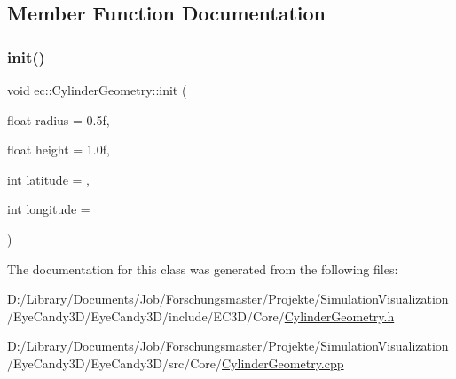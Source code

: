 \subsection{Member Function Documentation}
\mbox{\label{classec_1_1_cylinder_geometry_a099fbcb7e2fbbaec506ccc115ad90ffc}} 
\subsubsection{\texorpdfstring{init()}{init()}}
{\footnotesize\ttfamily void ec\+::\+Cylinder\+Geometry\+::init (\begin{DoxyParamCaption}\item[{float}]{radius = {\ttfamily 0.5f},  }\item[{float}]{height = {\ttfamily 1.0f},  }\item[{int}]{latitude = {},  }\item[{int}]{longitude = {} }\end{DoxyParamCaption})}



The documentation for this class was generated from the following files\+:\begin{DoxyCompactItemize}
\item 
D\+:/\+Library/\+Documents/\+Job/\+Forschungsmaster/\+Projekte/\+Simulation\+Visualization/\+Eye\+Candy3\+D/\+Eye\+Candy3\+D/include/\+E\+C3\+D/\+Core/\mbox{\hyperlink{_cylinder_geometry_8h}{Cylinder\+Geometry.\+h}}\item 
D\+:/\+Library/\+Documents/\+Job/\+Forschungsmaster/\+Projekte/\+Simulation\+Visualization/\+Eye\+Candy3\+D/\+Eye\+Candy3\+D/src/\+Core/\mbox{\hyperlink{_cylinder_geometry_8cpp}{Cylinder\+Geometry.\+cpp}}\end{DoxyCompactItemize}
